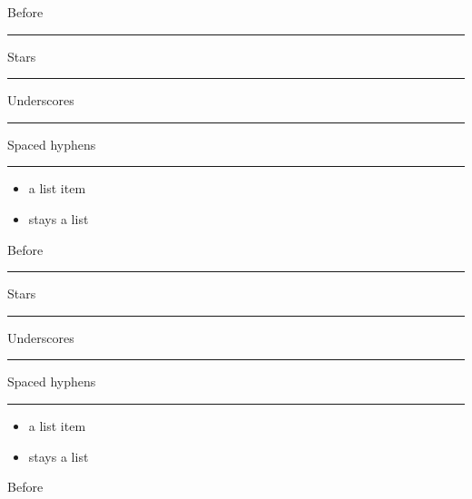 Before

\par\addvspace{\medskipamount}
\noindent\rule{\linewidth}{0.4pt}
\par\addvspace{\medskipamount}

Stars

\par\addvspace{\medskipamount}
\noindent\rule{\linewidth}{0.4pt}
\par\addvspace{\medskipamount}

Underscores

\par\addvspace{\medskipamount}
\noindent\rule{\linewidth}{0.4pt}
\par\addvspace{\medskipamount}

Spaced hyphens

\par\addvspace{\medskipamount}
\noindent\rule{\linewidth}{0.4pt}
\par\addvspace{\medskipamount}

\begin{itemize}
\item a list item
\item stays a list
\end{itemize}
Before

\par\addvspace{\medskipamount}
\noindent\rule{\linewidth}{0.4pt}
\par\addvspace{\medskipamount}

Stars

\par\addvspace{\medskipamount}
\noindent\rule{\linewidth}{0.4pt}
\par\addvspace{\medskipamount}

Underscores

\par\addvspace{\medskipamount}
\noindent\rule{\linewidth}{0.4pt}
\par\addvspace{\medskipamount}

Spaced hyphens

\par\addvspace{\medskipamount}
\noindent\rule{\linewidth}{0.4pt}
\par\addvspace{\medskipamount}

\begin{itemize}
\item a list item
\item stays a list
\end{itemize}
Before

